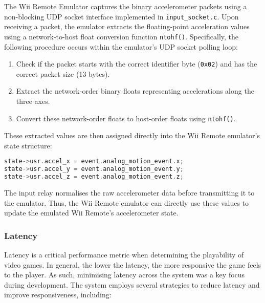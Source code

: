 The Wii Remote Emulator captures the binary accelerometer packets using a non-blocking UDP socket interface implemented in \texttt{input\_socket.c}. Upon receiving a packet, the emulator extracts the floating-point acceleration values using a network-to-host float conversion function \texttt{ntohf()}. Specifically, the following procedure occurs within the emulator's UDP socket polling loop:

\begin{enumerate}
	\item Check if the packet starts with the correct identifier byte (\texttt{0x02}) and has the correct packet size (13 bytes).
	\item Extract the network-order binary floats representing accelerations along the three axes.
	\item Convert these network-order floats to host-order floats using \texttt{ntohf()}.
\end{enumerate}

These extracted values are then assigned directly into the Wii Remote emulator’s state structure:

\begin{lstlisting}[language=C]
state->usr.accel_x = event.analog_motion_event.x;
state->usr.accel_y = event.analog_motion_event.y;
state->usr.accel_z = event.analog_motion_event.z;
\end{lstlisting}

The input relay normalises the raw accelerometer data before transmitting it to the emulator. Thus, the Wii Remote emulator can directly use these values to update the emulated Wii Remote’s accelerometer state.

\subsubsection{Latency}

Latency is a critical performance metric when determining the playability of video games. In general, the lower the latency, the more responsive the game feels to the player. As such, minimising latency across the system was a key focus during development. The system employs several strategies to reduce latency and improve responsiveness, including:

